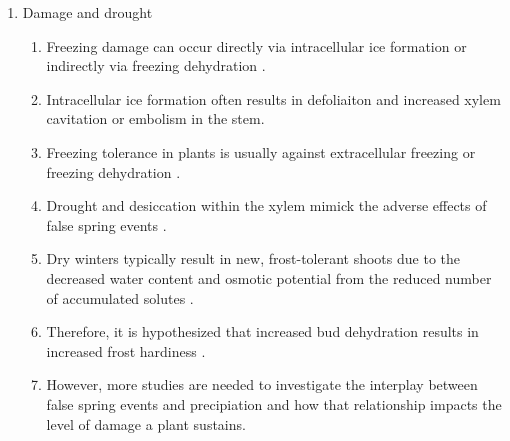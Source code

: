 \documentclass{article}\usepackage[]{graphicx}\usepackage[]{color}
\begin{document}
\begin{enumerate}
\item Damage and drought
\begin{enumerate}
\item Freezing damage can occur directly via intracellular ice formation or indirectly via freezing dehydration \citep{Pearce2001, Beck2004, Hofmann2015}.
\item Intracellular ice formation often results in defoliaiton and increased xylem cavitation or embolism in the stem.
\item Freezing tolerance in plants is usually against extracellular freezing or freezing dehydration \citep{Burke1976}.
\item Drought and desiccation within the xylem mimick the adverse effects of false spring events \citep{Cavender2015}.
\item Dry winters typically result in new, frost-tolerant shoots due to the decreased water content and osmotic potential from the reduced number of accumulated solutes \citep{Morin2007, Hofmann2015}.
\item Therefore, it is hypothesized that increased bud dehydration results in increased frost hardiness \citep{Beck2007, Nielsen2009, Poirier2010, Kathke2011, Hofmann2015}.
\item However, more studies are needed to investigate the interplay between false spring events and precipiation and how that relationship impacts the level of damage a plant sustains. 
\end{enumerate}
\end{enumerate}

\end{document}
